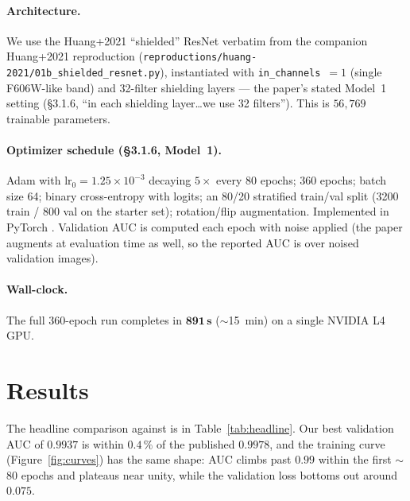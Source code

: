 \documentclass[11pt,letterpaper]{article}
\begin{document}
\paragraph{Architecture.} We use the Huang+2021 ``shielded'' ResNet
\autocite{huang2021desi} verbatim from the companion Huang+2021
reproduction (\texttt{reproductions/huang-2021/01b\_shielded\_resnet.py}),
instantiated with \texttt{in\_channels}~$=1$ (single F606W-like band) and
32-filter shielding layers --- the paper's stated Model~1 setting
(\S3.1.6, ``in each shielding layer\dots we use 32 filters''). This is
$56{,}769$ trainable parameters.

\paragraph{Optimizer schedule (\S3.1.6, Model~1).} Adam
\autocite{kingma2015adam} with $\mathrm{lr}_0 = 1.25\times10^{-3}$
decaying $5\times$ every 80 epochs; 360 epochs; batch size 64;
binary cross-entropy with logits; an 80/20 stratified train/val split
(3200 train / 800 val on the starter set); rotation/flip augmentation.
Implemented in PyTorch \autocite{paszke2019pytorch}. Validation AUC is
computed each epoch with noise applied (the paper augments at evaluation
time as well, so the reported AUC is over noised validation images).

\paragraph{Wall-clock.} The full 360-epoch run completes in
$\mathbf{891\,s}$ ($\sim$15~min) on a single NVIDIA L4 GPU.

\section{Results}

The headline comparison against \citet{silver2025ml} is in
Table~\ref{tab:headline}. Our best validation AUC of $0.9937$ is within
$0.4\,\%$ of the published $0.9978$, and the training curve
(Figure~\ref{fig:curves}) has the same shape: AUC climbs past $0.99$
within the first $\sim$80 epochs and plateaus near unity, while the
validation loss bottoms out around $0.075$.
\end{document}
